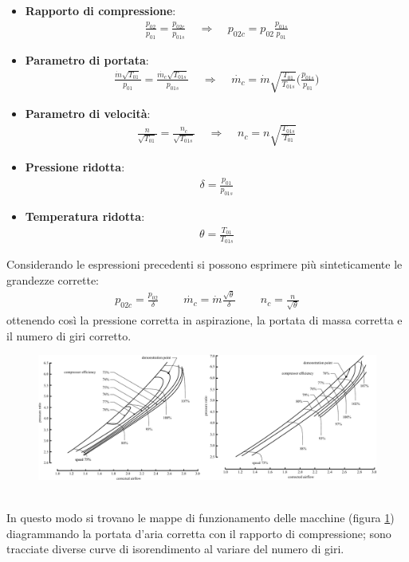 \begin{itemize}
	\item \textbf{Rapporto di compressione}:
	\begin{align*}
	\frac{p_{02}}{p_{01}} = \frac{p_{02c}}{p_{01s}} \;\;\;\; \Rightarrow \;\;\;\; p_{02c} = p_{02}\frac{p_{01s}}{p_{01}}
	\end{align*}
	\item \textbf{Parametro di portata}:
	\begin{align*}
	\frac{\dot{m}\sqrt{T_{01}}}{p_{01}}=\frac{\dot{m_c}\sqrt{T_{01s}}}{p_{01s}} \;\;\;\; \Rightarrow \;\;\;\; \dot{m_c} = \dot{m} \sqrt{\frac{T_{01}}{T_{01s}}} \bigg(\frac{p_{01s}}{p_{01}} \bigg)
	\end{align*}
	\item \textbf{Parametro di velocità}:
	\begin{align*}
	\frac{n}{\sqrt{T_{01}}}=\frac{n_c}{\sqrt{T_{01s}}} \;\;\;\; \Rightarrow \;\;\;\; n_c = n \sqrt{\frac{T_{01s}}{T_{01}}}
	\end{align*}
	\item \textbf{Pressione ridotta}:
	\begin{align*}
	\delta = \frac{p_{01}}{p_{01s}}
	\end{align*}
	\item \textbf{Temperatura ridotta}:
	\begin{align*}
	\theta = \frac{T_{01}}{T_{01s}}
	\end{align*}
\end{itemize}
Considerando le espressioni precedenti si possono esprimere più sinteticamente le grandezze corrette:
\begin{align*}
p_{02c} = \frac{p_{02}}{\delta} \;\;\;\;\;\;\;\; \dot{m_c}= \dot{m} \frac{\sqrt{\theta}}{\delta} \;\;\;\;\;\;\;\; n_c = \frac{n}{\sqrt{\theta}}
\end{align*}
ottenendo così la pressione corretta in aspirazione, la portata di massa corretta e il numero di giri corretto.
\begin{figure}
	\centering
	\includegraphics[width=\textwidth]{fig/CompMaps.pdf}
	\caption{}
	\label{fig:compMaps}
\end{figure}
\\In questo modo si trovano le mappe di funzionamento delle macchine (figura \ref{fig:compMaps}) diagrammando la portata d'aria corretta con il rapporto di compressione; sono tracciate diverse curve di isorendimento al variare del numero di giri.

